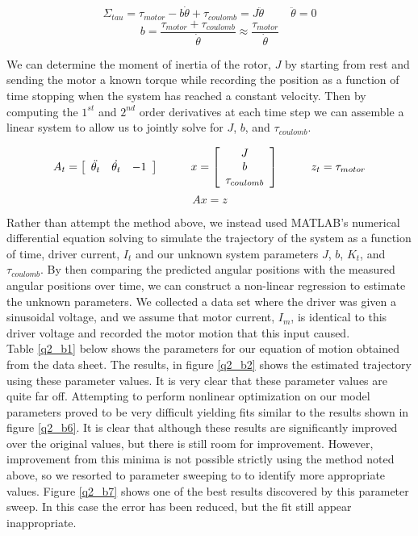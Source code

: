 \documentclass{article}
\theoremstyle{plain}
\theoremstyle{definition}
\theoremstyle{remark}
\begin{document}
$$ \Sigma_{tau} = \tau_{motor} - b\dot{\theta} + \tau_{coulomb} = J \ddot{\theta} \hspace{1cm} \ddot{\theta} = 0 $$
$$ b = \frac{\tau_{motor} + \tau_{coulomb}}{\dot{\theta}} \approx \frac{\tau_{motor}}{\dot{\theta}}$$

We can determine the moment of inertia of the rotor, $J$ by starting from rest and sending the motor a known torque while recording the position as a function of time stopping when the system has reached a constant velocity.  Then by computing the $1^{st}$ and $2^{nd}$ order derivatives at each time step we can assemble a linear system to allow us to jointly solve for $J$, $b$, and $\tau_{coulomb}$.

$$ A_{t} = \left[ \begin{array}{c c c} \ddot{\theta_{t}} & \dot{\theta_{t}} & -1 \end{array} \right]  \hspace{1cm} 
x = \left[ \begin{array}{c} J \\ b \\ \tau_{coulomb} \end{array} \right] \hspace{1cm} z_{t} = \tau_{motor} $$
$$ Ax = z $$

Rather than attempt the method above, we instead used MATLAB's numerical differential equation solving to simulate the trajectory of the system as a function of time, driver current, $I_t$ and our unknown system parameters $J$, $b$, $K_t$, and $\tau_{coulomb}$.  By then
comparing the predicted angular positions with the measured angular positions over time, we can construct a non-linear regression to estimate the unknown parameters.  We collected a data set where the driver was given a sinusoidal voltage, and we assume that motor current, $I_m$, is identical to this driver voltage and recorded the motor motion that this input caused. \\

Table \ref{q2_b1} below shows the parameters for our equation of motion obtained from the data sheet.  The results, in figure \ref{q2_b2} shows the estimated trajectory using these parameter values.  It is very clear that these parameter values are quite far off.  Attempting to perform nonlinear optimization on our model parameters proved to be very difficult yielding fits similar to the results shown in figure \ref{q2_b6}.  It is clear that although these  results are significantly improved over the original values, but there is still room for improvement.  However, improvement from this minima is not possible strictly using the method noted above, so we resorted to parameter sweeping to to identify more appropriate values.  Figure \ref{q2_b7} shows one of the best results discovered by this parameter sweep.  In this case the error has been reduced, but the fit still appear inappropriate.  \\
\end{document}
